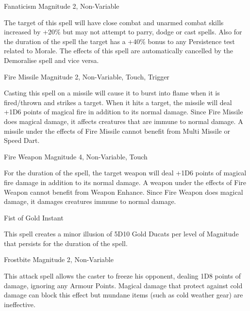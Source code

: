 \begin{rpg-spell}
{Fanaticism}
{Magnitude 2, Non-Variable}

The target of this spell will have close combat and unarmed combat skills increased by +20\% but may not attempt to parry, dodge or cast spells. Also for the duration of the spell the target has a +40\% bonus to any Persistence test related to Morale. The effects of this spell are automatically cancelled by the Demoralise spell and vice versa.
\end{rpg-spell}


\begin{rpg-spell}
{Fire Missile}
{Magnitude 2, Non-Variable, Touch, Trigger}

Casting this spell on a missile will cause it to burst into flame when it is fired/thrown and strikes a target. When it hits a target, the missile will deal +1D6 points of magical fire in addition to its normal damage. Since Fire Missile does magical damage, it affects creatures that are immune to normal damage. A missile under the effects of Fire Missile cannot benefit from Multi Missile or Speed Dart. 
\end{rpg-spell}


\begin{rpg-spell}
{Fire Weapon}
{Magnitude 4, Non-Variable, Touch}

For the duration of the spell, the target weapon will deal +1D6 points of magical fire damage in addition to its normal damage. A weapon under the effects of Fire Weapon cannot benefit from Weapon Enhance. Since Fire Weapon does magical damage, it damages creatures immune to normal damage.
\end{rpg-spell}


\begin{rpg-spell}
{Fist of Gold}
{Instant}

This spell creates a minor illusion of 5D10 Gold Ducats per level of Magnitude that persists for the duration of the spell.
\end{rpg-spell}


\begin{rpg-spell}
{Frostbite}
{Magnitude 2, Non-Variable}

This attack spell allows the caster to freeze his opponent, dealing 1D8 points of damage, ignoring any Armour Points. Magical damage that protect against cold damage can block this effect but mundane items (such as cold weather gear) are ineffective.
\end{rpg-spell}



